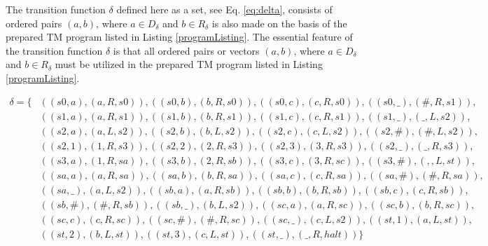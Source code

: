\documentclass[12pt, a4paper, bibliography=totocnumbered]{report}
\begin{document}
	The transition function $ \delta $ defined here as a set, see Eq. \ref{eq:delta}, consists of ordered pairs $ (a , b) $, where $ a \in D_{\delta} $ and $ b \in R_{\delta}  $ is also made on the basis of the prepared TM program listed in Listing \ref{programListing}. The essential feature of the transition function $ \delta $ is that all ordered pairs  or vectors $ (a , b) $, where $ a \in D_{\delta} $ and $ b \in R_{\delta}  $ must be utilized in the prepared TM program listed in Listing \ref{programListing}.
	
	\begin{equation} \label{eq:delta}
	\begin{aligned}
	\delta = \{&((s0, a), (a, R, s0)), ((s0, b), (b, R, s0)), ((s0, c), (c, R, s0)), ((s0, \_), (\#, R, s1)), \\
		       &((s1, a), (a, R, s1)), ((s1, b), (b, R, s1)), ((s1, c), (c, R, s1)), ((s1, \_), (\_, L, s2)), \\
		       &((s2, a), (a, L, s2)), ((s2, b), (b, L, s2)), ((s2, c), (c, L, s2)), ((s2, \#), (\#, L, s2)),  \\
		       &((s2, 1), (1, R, s3)), ((s2, 2), (2, R, s3)), ((s2, 3), (3, R, s3)), ((s2, \_), (\_, R, s3)),  \\
		       &((s3, a), (1, R, sa)), ((s3, b), (2, R, sb)), ((s3, c), (3, R, sc)), ((s3, \#), (,, L, st)),   \\
		       &((sa, a), (a, R, sa)), ((sa, b), (b, R, sa)), ((sa, c), (c, R, sa)), ((sa, \#), (\#, R, sa)),  \\
		       &((sa, \_),(a, L, s2)), ((sb, a), (a, R, sb)), ((sb, b), (b, R, sb)), ((sb, c), (c, R, sb)),   \\
		       &((sb, \#),(\#, R, sb)),((sb, \_), (b, L, s2)), ((sc, a), (a, R, sc)), ((sc, b), (b, R, sc)), \\
		       &((sc, c), (c, R, sc)), ((sc, \#), (\#, R, sc)), ((sc, \_), (c, L, s2)), ((st, 1), (a, L, st)), \\
		       &((st, 2), (b, L, st)), ((st, 3), (c, L, st)), ((st, \_), (\_, R, halt))\}
	\end{aligned}
	\end{equation}
\end{document}
